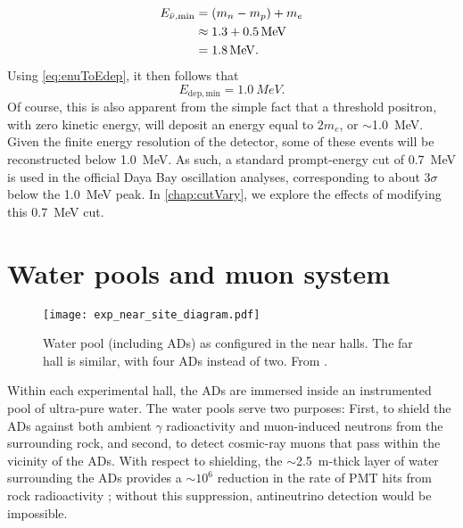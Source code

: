 \documentclass[../thesis.tex]{subfiles}
\begin{document}
\begin{align*}
  E_{\bar\nu,\mathrm{min}} &= (m_n - m_p) + m_e \\
                    &\approx 1.3 + \SI{0.5}{MeV} \\
                    &= \SI{1.8}{MeV}.
\end{align*}
Using \autoref{eq:enuToEdep}, it then follows that
\begin{equation}
  E_{\mathrm{dep},\mathrm{min}} = \SI{1.0}{MeV}.
\end{equation}
Of course, this is also apparent from the simple fact that a threshold positron, with zero kinetic energy, will deposit an energy equal to $2m_e$, or $\sim$1.0~MeV. Given the finite energy resolution of the detector, some of these events will be reconstructed below 1.0~MeV. As such, a standard prompt-energy cut of 0.7~MeV is used in the official Daya Bay oscillation analyses, corresponding to about 3$\sigma$ below the 1.0~MeV peak. In \autoref{chap:cutVary}, we explore the effects of modifying this 0.7~MeV cut.

\section{Water pools and muon system}
\label{sec:expShieldVeto}

\begin{figure}[ht]
  \texttt{[image: exp\_near\_site\_diagram.pdf]}
  \caption{Water pool (including ADs) as configured in the near halls. The far hall is similar, with four ADs instead of two. From \cite{An_2017}.}
  \label{fig:expPool}
\end{figure}

Within each experimental hall, the ADs are immersed inside an instrumented pool of ultra-pure water. The water pools serve two purposes: First, to shield the ADs against both ambient $\gamma$ radioactivity and muon-induced neutrons from the surrounding rock, and second, to detect cosmic-ray muons that pass within the vicinity of the ADs. With respect to shielding, the $\sim$2.5~m-thick layer of water surrounding the ADs provides a $\sim10^6$ reduction in the rate of PMT hits from rock radioactivity \cite{Hack_2014}; without this suppression, antineutrino detection would be impossible.
\end{document}
